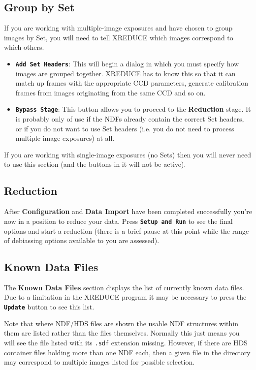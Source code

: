 \documentclass[11pt]{article}
\newcommand{\xlabel}[1]{}
\newcommand{\butt}[1]{{\bf \tt #1}}
\newcommand{\wlab}[1]{{\bf #1}}
\newcommand{\text}[1]{{\tt #1}}
\begin{document}
\subsection{Group by Set \xlabel{CCDMainSets}}
If you are working with multiple-image exposures and have chosen
to group images by Set, you will need to tell XREDUCE which 
images correspond to which others.  
\begin{itemize}
\item \butt{Add Set Headers}:
This will begin a dialog in which you must specify how images are
grouped together.  XREDUCE has to know this so that it can match up
frames with the appropriate CCD parameters, generate calibration
frames from images originating from the same CCD and so on.
\item \butt{Bypass Stage}:
This button allows you to proceed to the \wlab{Reduction} stage.
It is probably only of use if the NDFs already contain the 
correct Set headers, or if you do not want to use Set headers
(i.e. you do not need to process multiple-image exposures) at all.
\end{itemize}

If you are working with single-image exposures (no Sets) then you
will never need to use this section (and the buttons in it will
not be active).

\subsection{Reduction \xlabel{CCDMainReduction}}
After \wlab{Configuration} and \wlab{Data Import} have been completed
successfully you're now in a position to reduce your data. Press
\butt{Setup and Run} to see the final options and start a reduction
(there is a brief pause at this point while the range of debiassing
options available to you are assessed).

\subsection{Known Data Files \xlabel{CCDMainKnownData}}
The \wlab{Known Data Files} section displays the list of currently
known data files. Due to a limitation in the XREDUCE program it may be
necessary to press the \butt{Update} button to see this list.

Note that where NDF/HDS files are shown the usable NDF structures
within them are listed rather than the files themselves.
Normally this just means you will see the file listed 
with its \text{.sdf} extension missing.  However, if there are HDS
container files holding more than one NDF each, then a given
file in the directory may correspond to multiple images listed
for possible selection.
\end{document}
